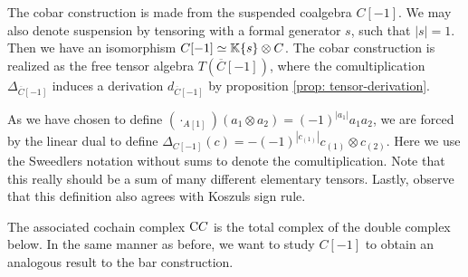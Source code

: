 \documentclass[../thesis.tex]{subfiles}
\begin{document}
            \begin{center}

            \end{center}
            
            The cobar construction is made from the suspended coalgebra $C[-1]$. We may also denote suspension by tensoring with a formal generator $s$, such that $|s| = 1$. Then we have an isomorphism $C[-1] \simeq \mathbb{K}\startset{s}\otimes C$. The cobar construction is realized as the free tensor algebra $T(\overline{C}[-1])$, where the comultiplication $\Delta_{\overline{C}[-1]}$ induces a derivation $d_{\overline{C}[-1]}$ by proposition \ref{prop: tensor-derivation}.

            \begin{remark}
                As we have chosen to define $(\cdot_{A[1]})(a_1\otimes a_2)=(-1)^{|a_1|}a_1a_2$, we are forced by the linear dual to define $\Delta_{C[-1]}(c)=-(-1)^{|c_{(1)}|}c_{(1)}\otimes c_{(2)}$. Here we use the Sweedlers notation without sums to denote the comultiplication. Note that this really should be a sum of many different elementary tensors. Lastly, observe that this definition also agrees with Koszuls sign rule.
            \end{remark}

            The associated cochain complex $\tt{C}C$ is the total complex of the double complex below. In the same manner as before, we want to study $C[-1]$ to obtain an analogous result to the bar construction.
\end{document}
